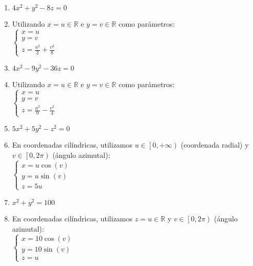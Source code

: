 \documentclass[a4paper]{article}
\newcommand{\answer}{\item[**]}
\newcommand{\SEL}[1]{ \left\{\begin{matrix} #1 \end{matrix}\right. }
\newcommand{\df}[2]{\displaystyle\frac{#1}{#2}}
\begin{document}
\begin{enumerate}
\begin{multicols}{2}
\begin{enumerate} [label=(\alph*)]
		\item $4x^2+y^2-8z=0$
		\answer Utilizando $x=u \in \mathbb{R}$ e $y=v\in \mathbb{R}$ como parámetros: \\ $\SEL{x=u \\ y=v \\ z=\df{u^2}{2}+\df{v^2}{8}}$

		\item $4x^2-9y^2-36z=0$
		\answer Utilizando $x=u \in \mathbb{R}$ e $y=v\in \mathbb{R}$ como parámetros: \\ $\SEL{x=u \\ y=v \\ z=\df{u^2}{9}-\df{v^2}{4}}$

		\item $5x^2+5y^2-z^2=0$
		\answer En coordenadas cilíndricas, utilizamos $u \in \left[0,+\infty\right)$ (coordenada radial) y $v \in \left[0,2\pi\right)$ (ángulo azimutal): \\ $\SEL{x=u\cos(v) \\ y=u \sin(v) \\ z=5u}$

		\item $x^2+y^2=100$
		\answer En coordenadas cilíndricas, utilizamos $z=u \in \mathbb{R}$ y $v \in \left[0,2\pi\right)$ (ángulo azimutal): \\ $\SEL{x=10\cos(v) \\ y=10 \sin(v) \\ z=u}$

	\end{enumerate}
	\end{multicols}

\end{enumerate}
\end{document}
